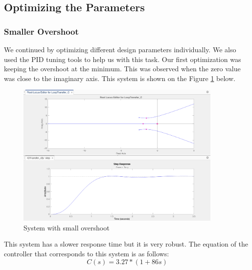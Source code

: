 \newpage
\subsection{Optimizing the Parameters }
\subsubsection{Smaller Overshoot}
We continued by optimizing different design parameters individually. We also used the PID tuning tools to help us with this task. Our first optimization was keeping the overshoot at the minimum. This was observed when the zero value was close to the imaginary axis. This system is shown on the Figure \ref{fig:overs} below.

\begin{figure}[H]
    \centering
    \includegraphics[width=0.9\textwidth]{images/minimum overshoot.png}
    \caption{System with small overshoot}
    \label{fig:overs}
\end{figure}

This system has a slower response time but it is very robust. The equation of the controller that corresponds to this system is as follows:
\begin{equation}
    C(s) = 3.27 * (1 + 86s)
\end{equation}


